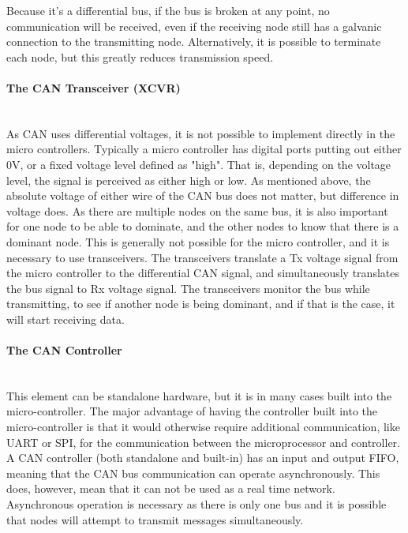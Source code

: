 Because it's a differential bus, if the bus is broken at any point, no communication will be received, even if the receiving node still has a galvanic connection to the transmitting node.
Alternatively, it is possible to terminate each node, but this greatly reduces transmission speed.\\

\paragraph*{The CAN Transceiver (XCVR)}~\\
As CAN uses differential voltages, it is not possible to implement directly in the micro controllers.
Typically a micro controller has digital ports putting out either $ 0 \si{\volt}$, or a fixed voltage level defined as "high".
That is, depending on the voltage level, the signal is perceived as either high or low.
As mentioned above, the absolute voltage of either wire of the CAN bus does not matter, but difference in voltage does. 
As there are multiple nodes on the same bus, it is also important for one node to be able to dominate, and the other nodes to know that there is a dominant node.
This is generally not possible for the micro controller, and it is necessary to use transceivers.
The transceivers translate a Tx voltage signal from the micro controller to the differential CAN signal, and simultaneously translates the bus signal to Rx voltage signal.
The transceivers monitor the bus while transmitting, to see if another node is being dominant, and if that is the case, it will start receiving data.

\paragraph*{The CAN Controller}~\\
This element can be standalone hardware, but it is in many cases built into the micro-controller.
The major advantage of having the controller built into the micro-controller is that it would otherwise require additional communication, like UART or SPI, for the communication between the microprocessor and controller.
A CAN controller (both standalone and built-in) has an input and output FIFO, meaning that the CAN bus communication can operate asynchronously.
This does, however, mean that it can not be used as a real time network.
Asynchronous operation is necessary as there is only one bus and it is possible that nodes will attempt to transmit messages simultaneously.

